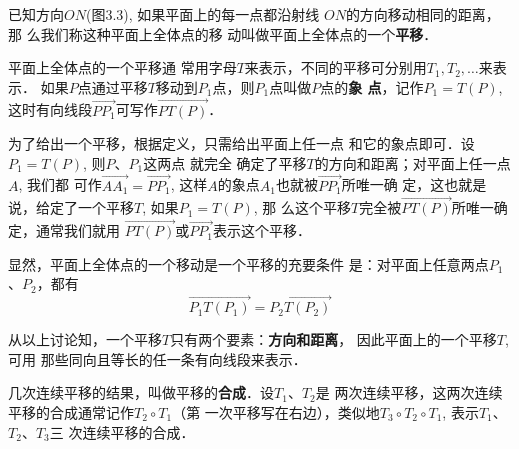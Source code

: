 已知方向$ON$(图3.3), 如果平面上的每一点都沿射线
$ON$的方向移动相同的距离，那
么我们称这种平面上全体点的移
动叫做平面上全体点的一个\textbf{平移}．

\begin{figure}[htp]\centering
    \begin{minipage}[t]{0.48\textwidth}
    \centering
{}
    \caption{}
    \end{minipage}
    \begin{minipage}[t]{0.48\textwidth}
    \centering
    \caption{}
    \end{minipage}
    \end{figure}

平面上全体点的一个平移通
常用字母$T$来表示，不同的平移可分别用$T_1,T_2,\ldots$来表示．
如果$P$点通过平移$T$移动到$P_1$点，则$P_1$点叫做$P$点的\textbf{象
点}，记作$P_1=T(P)$, 这时有向线段$\Vec{PP_1}$可写作$\Vec{PT(P)}$．

为了给出一个平移，根据定义，只需给出平面上任一点
和它的象点即可．设$P_1=T(P)$, 则$P$、$P_1$这两点 就完全
确定了平移$T$的方向和距离；对平面上任一点$A$, 我们都
可作$\Vec{AA_1}=\Vec{PP_1}$, 这样$A$的象点$A_1$也就被$\Vec{PP_1}$所唯一确
定，这也就是说，给定了一个平移$T$, 如果$P_1=T(P)$, 那
么这个平移$T$完全被$\Vec{PT(P)}$所唯一确定，通常我们就用
$\Vec{PT(P)}$或$\Vec{PP_1}$表示这个平移．

显然，平面上全体点的一个移动是一个平移的充要条件
是：对平面上任意两点$P_1$、$P_2$，都有
\[\Vec{P_1T(P_1)}=\Vec{P_2T(P_2)}\]

从以上讨论知，一个平移$T$只有两个要素：\textbf{方向和距离}，
因此平面上的一个平移$T$, 可用
那些同向且等长的任一条有向线段来表示．

几次连续平移的结果，叫做平移的\textbf{合成}．设$T_1$、$T_2$是
两次连续平移，这两次连续平移的合成通常记作$T_2\circ T_1$（第
一次平移写在右边），类似地$T_3\circ T_2\circ T_1$, 表示$T_1$、$T_2$、$T_3$三
次连续平移的合成．

